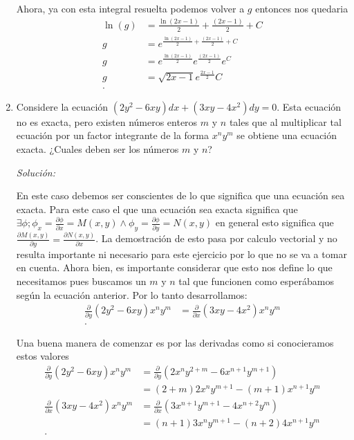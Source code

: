 \begin{enumerate}
	Ahora, ya con esta integral resuelta podemos volver a $g$ entonces nos quedaria
	\begin{align*}
	  \ln\left( g \right) &=  \frac{\ln\left( 2x - 1 \right) }{2} + \frac{\left( 2x - 1 \right) }{2} + C\\
	  g &= e^{\frac{\ln\left( 2x - 1 \right) }{2} + \frac{\left( 2x - 1 \right) }{2} + C} \\
	g &= e^{\frac{\ln\left( 2x - 1 \right) }{2}} e^{\frac{\left( 2x - 1 \right) }{2}}e^{C} \\
	g &= \sqrt{2x-1} e^{\frac{2x-1}{2}}C \\
	.\end{align*}

      \item Considere la ecuación $\left( 2y^2-6xy \right) dx + \left( 3xy -4x^2\right)dy = 0 $. Esta ecuación no es exacta, pero existen números enteros $m$ y $n$ tales que al multiplicar tal ecuación por un factor integrante de la forma $x^{n}y^{m}$ se obtiene una ecuación exacta. ¿Cuales deben ser los números $m$ y $n$?

	\textit{Solución:}
	
	En este caso debemos ser conscientes de lo que significa que una ecuación sea exacta. Para este caso el que una ecuación sea exacta significa que $\exists \phi ; \phi_x = \frac{\partial \phi}{\partial x} = M(x,y) \land \phi_y = \frac{\partial \phi}{\partial y} = N(x,y)$ en general esto significa que $\frac{\partial M(x,y)}{\partial y} = \frac{\partial N(x,y)}{\partial x} $. La demostración de esto pasa por calculo vectorial y no resulta importante ni necesario para este ejercicio por lo que no se va a tomar en cuenta. Ahora bien, es importante considerar que esto nos define lo que necesitamos pues buscamos un $m$ y $n$ tal que funcionen como esperábamos según la ecuación anterior. Por lo tanto desarrollamos:
	\begin{align*}
	  \frac{\partial}{\partial y} \left( 2y^2 - 6xy \right) x^{n}y^{m} &= \frac{\partial }{\partial x}\left( 3xy - 4x^2 \right)x^{n}y^{m}   \\
	.\end{align*}

	Una buena manera de comenzar es por las derivadas como si conocieramos estos valores
	\begin{align*}
	  \frac{\partial}{\partial y} \left( 2y^2 - 6xy \right) x^{n}y^{m} &= \frac{\partial  }{\partial y} \left( 2x^{n}y^{2+m}-6x^{n+1}y^{m+1} \right)\\
	&= (2+m) 2x^{n}y^{m+1} - (m+1)x^{n+1}y^{m} \\
	  \frac{\partial }{\partial x}\left( 3xy - 4x^2 \right)x^{n}y^{m} &= \frac{\partial  }{\partial x} \left( 3x^{n+1}y^{m+1} - 4x^{n+2}y^{m} \right)  \\
	  &= (n+1)3x^{n}y^{m+1}-\left( n+2 \right) 4x^{n+1}y^{m} \\
	.\end{align*}


\end{enumerate}
